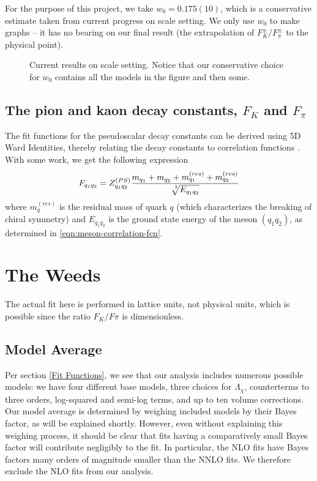 \documentclass[prd,tightenlines,preprintnumbers,showpacs,superscriptaddress,notitlepage,eqsecnum,floatfix,notitlepage]{revtex4-1}
\newcommand{\includegraphicsifexists}[2][]{\IfFileExists{#2}{\texttt{[image: \#2]}}{\texttt{[image: \#2]}}}
\begin{document}
For the purpose of this project, we take $w_0 = 0.175(10)$, which is a conservative estimate taken from current progress on scale setting. We only use $w_0$ to make graphs -- it has no bearing on our final result (the extrapolation of $F^\pm_K/F^\pm_\pi$ to the physical point).

\begin{figure}
	\includegraphicsifexists[width=0.75\textwidth]{./../figs/w0_comparison.pdf}
	\caption{Current results on scale setting. Notice that our conservative choice for $w_0$ contains all the models in the figure and then some.}
\end{figure}

\subsection{The pion and kaon decay constants, $F_K$ and $F_\pi$}
The fit functions for the pseudoscalar decay constants can be derived using 5D Ward Identities, thereby relating the decay constants to correlation functions \cite{Berkowitz:2017opd}. With some work, we get the following expression
\begin{equation}
F_{q_1 q_2} = Z^{(PS)}_{q_1 q_2}\frac{m_{q_1} + m_{q_2} + m^{(res)}_{q_1} + m^{(res)}_{q_2} }{\sqrt[\leftroot{-3}\uproot{3}3]{E_{q_1 q_2}}}
\end{equation}
where $m^{(res)}_q$ is the residual mass of quark $q$ (which characterizes the breaking of chiral symmetry) and $E_{q_1 q_2}$ is the ground state energy of the meson $(q_1 q_2)$, as determined in \eqref{eqn:meson-correlation-fcn}.



\section{The Weeds}
The actual fit here is performed in lattice units, not physical units, which is possible since the ratio $F_K / F\pi$ is dimensionless.

\subsection{Model Average}
Per section \ref{Fit Functions}, we see that our analysis includes numerous possible models: we have four different base models, three choices for $\Lambda_\chi$, counterterms to three orders, log-squared and semi-log terms, and up to ten volume corrections. Our model average is determined by weighing included models by their Bayes factor, as will be explained shortly. However, even without explaining this weighing process, it should be clear that fits having a comparatively small Bayes factor will contribute negligibly to the fit. In particular, the NLO fits have Bayes factors many orders of magnitude smaller than the NNLO fits. We therefore exclude the NLO fits from our analysis.
\end{document}
